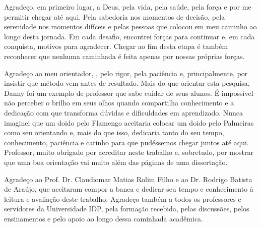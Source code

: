 
\begin{agradecimentos}
Agradeço, em primeiro lugar, a Deus, pela vida, pela saúde, pela força e por me
permitir chegar até aqui. Pela sabedoria nos momentos de decisão, pela
serenidade nos momentos difíceis e pelas pessoas que colocou em meu caminho ao
longo desta jornada. Em cada desafio, encontrei forças para continuar e, em
cada conquista, motivos para agradecer. Chegar ao fim desta etapa é também
reconhecer que nenhuma caminhada é feita apenas por nossas próprias forças.

Agradeço ao meu orientador, \NomeOrientador, pelo rigor, pela paciência e,
principalmente, por insistir que método vem antes de resultado. Mais do que
orientar esta pesquisa, Danny foi um exemplo de professor que sabe cuidar de
seus alunos. É impossível não perceber o brilho em seus olhos quando compartilha
conhecimento e a dedicação com que transforma dúvidas e dificuldades em
aprendizado. Nunca imaginei que um doido pelo Flamengo aceitaria colocar um
doido pelo Palmeiras como seu orientando e, mais do que isso, dedicaria tanto do
seu tempo, conhecimento, paciência e carinho para que pudéssemos chegar juntos
até aqui. Professor, muito obrigado por acreditar neste trabalho e, sobretudo,
por mostrar que uma boa orientação vai muito além das páginas de uma
dissertação.

Agradeço ao Prof. Dr. Claudiomar Matias Rolim Filho e ao Dr. Rodrigo Batista de Araújo, que
aceitaram compor a banca e dedicar seu tempo e conhecimento à leitura e
avaliação deste trabalho. Agradeço também a todos os professores e servidores da
Universidade IDP, pela formação
recebida, pelas discussões, pelos ensinamentos e pelo apoio ao longo dessa
caminhada acadêmica.


\end{agradecimentos}
